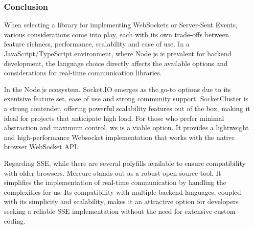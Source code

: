 \subsubsection{Conclusion}

When selecting a library for implementing WebSockets or Server-Sent Events, various considerations come into play, each with its own trade-offs between feature richness, performance, scalability and ease of use. In a JavaScript/TypeScript environment, where Node.js is prevalent for backend development, the language choice directly affects the available options and considerations for real-time communication libraries.

In the Node.js ecosystem, Socket.IO emerges as the go-to options due to its exentsive feature set, ease of use and strong community support. SocketCluster is a strong contender, offering powerful scalability features out of the box, making it ideal for projects that anticipate high load. For those who prefer minimal abstraction and maximum control, ws is a viable option. It provides a lightweight and high-performance Websocket implementation that works with the native browser WebSocket API.

Regarding SSE, while there are several polyfills available to ensure compatibility with older browsers. Mercure stands out as a robust open-source tool. It simplifies the implementation of real-time communication by handling the complexities for us. Its compatibility with multiple backend languages, coupled with its simplicity and scalability, makes it an attractive option for developers seeking a reliable SSE implementation without the need for extensive custom coding.

